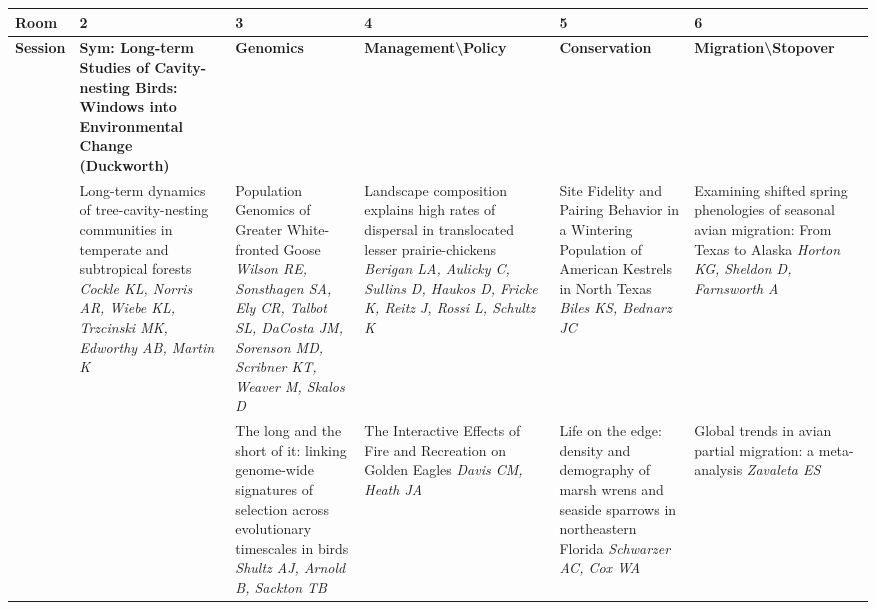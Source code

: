 \begin{tabular}{|x{0.75cm}|a{2.25cm}|x{2.25cm}|x{2.25cm}|x{2.25cm}|x{2.25cm}|}\hline
Room & 2 & 3 & 4 & 5 & 6\\
\hline
\rule{0pt}{1em} \textbf{Session} &\footnotesize \textbf{Sym: Long-term Studies of Cavity-nesting Birds: Windows into Environmental Change (Duckworth)} & \footnotesize \textbf{Genomics} & \footnotesize \textbf{Management\textbackslash Policy} & \footnotesize \textbf{Conservation} & \footnotesize \textbf{Migration\textbackslash Stopover}\\
\hline
{}&Long-term dynamics of tree-cavity-nesting communities in temperate and subtropical forests \newline \newline \textit{Cockle KL, Norris AR, Wiebe KL, Trzcinski MK, Edworthy AB, Martin K} & Population Genomics of Greater White-fronted Goose \newline \newline \textit{Wilson RE, Sonsthagen SA, Ely CR, Talbot SL, DaCosta JM, Sorenson MD, Scribner KT, Weaver M, Skalos D} & Landscape composition explains high rates of dispersal in translocated lesser prairie-chickens \newline \newline \textit{Berigan LA, Aulicky C, Sullins D, Haukos D, Fricke K, Reitz J, Rossi L, Schultz K} & Site Fidelity and Pairing Behavior in a Wintering Population of American Kestrels in North Texas \newline \newline \textit{Biles KS, Bednarz JC} & Examining shifted spring phenologies of seasonal avian migration: From Texas to Alaska \newline \newline \textit{Horton KG, Sheldon D, Farnsworth A}\\
\hline
{}& \newline \newline \textit{} & The long and the short of it: linking genome-wide signatures of selection across evolutionary timescales in birds \newline \newline \textit{Shultz AJ, Arnold B, Sackton TB} & The Interactive Effects of Fire and Recreation on Golden Eagles \newline \newline \textit{Davis CM, Heath JA} & Life on the edge: density and demography of marsh wrens and seaside sparrows in northeastern Florida \newline \newline \textit{Schwarzer AC, Cox WA} & Global trends in avian partial migration: a meta-analysis \newline \newline \textit{Zavaleta ES}\\

\end{tabular}
